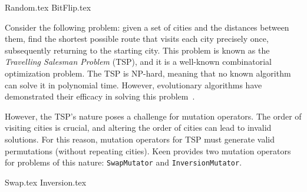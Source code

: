   {Random.tex}
  {BitFlip.tex}

  Consider the following problem: given a set of cities and the distances between them, find the shortest possible
  route that visits each city precisely once, subsequently returning to the starting city. This problem is known as the
  \textit{Travelling Salesman Problem} (TSP), and it is a well-known combinatorial optimization problem. The TSP is
  NP-hard, meaning that no known algorithm can solve it in polynomial time. However, evolutionary algorithms have
  demonstrated their efficacy in solving this 
  problem~\autocite{goldbergAllelesLociTraveling1985,bergelAgileArtificialIntelligence2020}.

  However, the TSP's nature poses a challenge for mutation operators. The order of visiting cities is crucial, and
  altering the order of cities can lead to invalid solutions. For this reason, mutation operators for TSP must generate
  valid permutations (without repeating cities). Keen provides two mutation operators for problems of this nature:
  \texttt{SwapMutator} and \texttt{InversionMutator}.

  {Swap.tex}
  {Inversion.tex}
